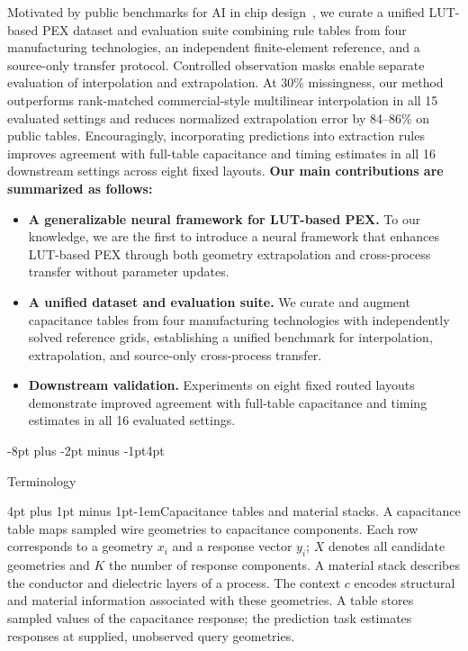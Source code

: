 \documentclass{article}
\makeatletter
\renewcommand{\section}{\@startsection{section}{1}{\z@}
  {-8pt plus -2pt minus -1pt}{4pt}{\large\sc\raggedright}}
\renewcommand{\paragraph}{\@startsection{paragraph}{4}{\z@}
  {4pt plus 1pt minus 1pt}{-1em}{\normalsize\bf}}
\makeatother
\begin{document}
Motivated by public benchmarks for AI in chip design~\citep{circuitnet2},
we curate a unified LUT-based PEX dataset and evaluation suite combining rule
tables from four manufacturing technologies, an independent finite-element
reference, and a source-only transfer protocol. Controlled observation masks
enable separate evaluation of interpolation and extrapolation.
At 30\% missingness, our method outperforms rank-matched commercial-style
multilinear interpolation in all 15 evaluated settings and reduces normalized
extrapolation error by 84--86\% on public tables.
Encouragingly, incorporating predictions into extraction rules improves
agreement with full-table capacitance and timing estimates in all 16 downstream
settings across eight fixed layouts.
\textbf{Our main contributions are summarized as follows:}
\begin{itemize}
\item \textbf{A generalizable neural framework for LUT-based PEX.}
To our knowledge, we are the first to introduce a neural framework
that enhances LUT-based PEX through both geometry extrapolation
and cross-process transfer without parameter updates.
\item \textbf{A unified dataset and evaluation suite.}
We curate and augment capacitance tables from four manufacturing
technologies with independently solved reference grids, establishing
a unified benchmark for interpolation, extrapolation, and
source-only cross-process transfer.
\item \textbf{Downstream validation.}
Experiments on eight fixed routed layouts demonstrate
improved agreement with full-table capacitance and timing estimates in all
16 evaluated settings.
\end{itemize}

\section{Terminology}
\label{sec:terminology}

\paragraph{Capacitance tables and material stacks.}
A capacitance table maps sampled wire geometries to capacitance components.
Each row corresponds to a geometry $x_i$ and a response vector $y_i$;
$X$ denotes all candidate geometries and $K$ the number of response components.
A material stack describes the conductor and dielectric layers of a process.
The context $c$ encodes structural and material information associated with
these geometries. A table stores sampled values of the capacitance response;
the prediction task estimates responses at supplied, unobserved query geometries.
\end{document}

